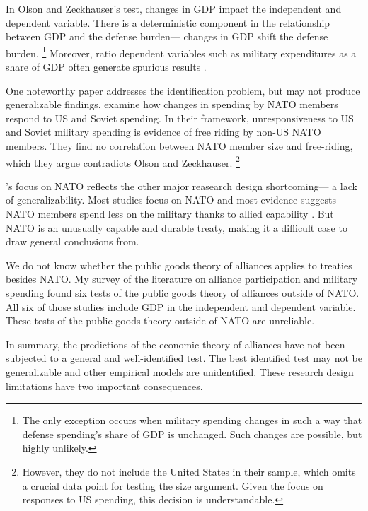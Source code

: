 \documentclass[12pt]{article}
\begin{document}
In Olson and Zeckhauser's test, changes in GDP impact the independent and dependent variable. 
There is a deterministic component in the relationship between GDP and the defense burden--- changes in GDP shift the defense burden.
\footnote{The only exception occurs when military spending changes in such a way that defense spending's share of GDP is unchanged. Such changes are possible, but highly unlikely.}  
Moreover, ratio dependent variables such as military expenditures as a share of GDP often generate spurious results \citep{Kronmal1993}. 


One noteworthy paper addresses the identification problem, but may not produce generalizable findings. 
\citet{PluemperNeumayer2015} examine how changes in spending by NATO members respond to US and Soviet spending. 
In their framework, unresponsiveness to US and Soviet military spending is evidence of free riding by non-US NATO members.
They find no correlation between NATO member size and free-riding, which they argue contradicts Olson and Zeckhauser. 
\footnote{However, they do not include the United States in their sample, which omits a crucial data point for testing the size argument. Given the focus on responses to US spending, this decision is understandable.}


\citet{PluemperNeumayer2015}'s focus on NATO reflects the other major reasearch design shortcoming--- a lack of generalizability. 
Most studies focus on NATO and most evidence suggests NATO members spend less on the military thanks to allied capability \citep{GeorgeSandler2017}.
But NATO is an unusually capable and durable treaty, making it a difficult case to draw general conclusions from. 


We do not know whether the public goods theory of alliances applies to treaties besides NATO. 
My survey of the literature on alliance participation and military spending found six tests of the public goods theory of alliances outside of NATO. 
All six of those studies include GDP in the independent and dependent variable. 
These tests of the public goods theory outside of NATO are unreliable. 


In summary, the predictions of the economic theory of alliances have not been subjected to a general and well-identified test. 
The best identified test may not be generalizable and other empirical models are unidentified. 
These research design limitations have two important consequences.
\end{document}
